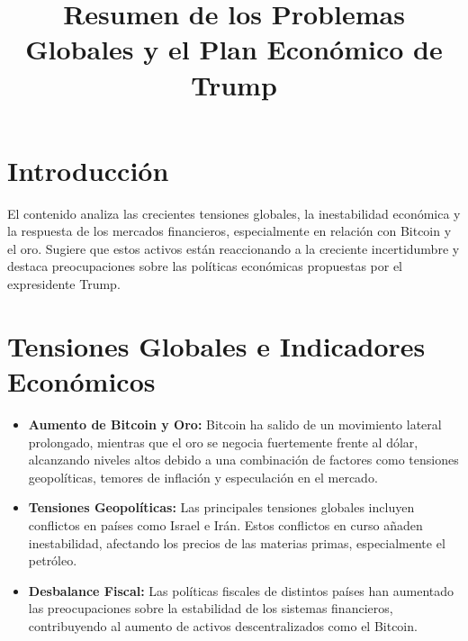 \documentclass{article}
\title{Resumen de los Problemas Globales y el Plan Económico de Trump}
\author{}
\date{}
\begin{document}
\maketitle

\section*{Introducción}
El contenido analiza las crecientes tensiones globales, la inestabilidad económica y la respuesta de los mercados financieros, especialmente en relación con Bitcoin y el oro. Sugiere que estos activos están reaccionando a la creciente incertidumbre y destaca preocupaciones sobre las políticas económicas propuestas por el expresidente Trump.

\section*{Tensiones Globales e Indicadores Económicos}
\begin{itemize}
    \item \textbf{Aumento de Bitcoin y Oro:} Bitcoin ha salido de un movimiento lateral prolongado, mientras que el oro se negocia fuertemente frente al dólar, alcanzando niveles altos debido a una combinación de factores como tensiones geopolíticas, temores de inflación y especulación en el mercado.
    \item \textbf{Tensiones Geopolíticas:} Las principales tensiones globales incluyen conflictos en países como Israel e Irán. Estos conflictos en curso añaden inestabilidad, afectando los precios de las materias primas, especialmente el petróleo.
    \item \textbf{Desbalance Fiscal:} Las políticas fiscales de distintos países han aumentado las preocupaciones sobre la estabilidad de los sistemas financieros, contribuyendo al aumento de activos descentralizados como el Bitcoin.
\end{itemize}
\end{document}
